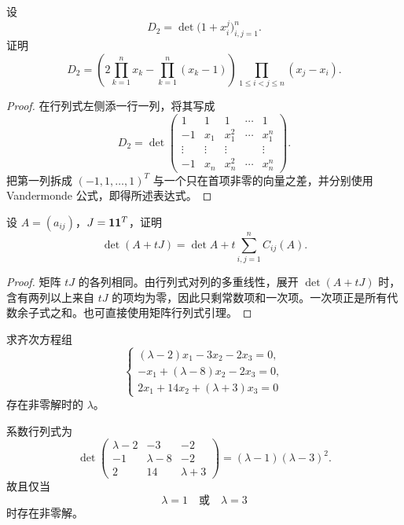 \begin{exercise}
设
\begin{equation}
 D_2=\det\bigl(1+x_i^j\bigr)_{i,j=1}^n.
\end{equation}
证明
\begin{equation}
 D_2=
 \left(2\prod_{k=1}^n x_k-\prod_{k=1}^n(x_k-1)\right)
 \prod_{1\leq i<j\leq n}(x_j-x_i).
\end{equation}
\end{exercise}

\begin{proof}
在行列式左侧添一行一列，将其写成
\begin{equation}
 D_2=
 \det\begin{pmatrix}
 1&1&1&\cdots&1\\
 -1&x_1&x_1^2&\cdots&x_1^n\\
 \vdots&\vdots&\vdots&&\vdots\\
 -1&x_n&x_n^2&\cdots&x_n^n
 \end{pmatrix}.
\end{equation}
把第一列拆成 $(-1,1,\ldots,1)^T$ 与一个只在首项非零的向量之差，并分别使用 Vandermonde 公式，即得所述表达式。
\end{proof}

\begin{exercise}[全体元素同时加参数]
设 $A=(a_{ij})$，$J=\bm 1\bm 1^T$，证明
\begin{equation}
 \det(A+tJ)=\det A+t\sum_{i,j=1}^n C_{ij}(A).
\end{equation}
\end{exercise}

\begin{proof}
矩阵 $tJ$ 的各列相同。由行列式对列的多重线性，展开 $\det(A+tJ)$ 时，含有两列以上来自 $tJ$ 的项均为零，因此只剩常数项和一次项。一次项正是所有代数余子式之和。也可直接使用矩阵行列式引理。
\end{proof}

\begin{exercise}[参数特征方程]
求齐次方程组
\begin{equation}
\begin{cases}
 (\lambda-2)x_1-3x_2-2x_3=0,\\
 -x_1+(\lambda-8)x_2-2x_3=0,\\
 2x_1+14x_2+(\lambda+3)x_3=0
\end{cases}
\end{equation}
存在非零解时的 $\lambda$。
\end{exercise}

\begin{solution}
系数行列式为
\begin{equation}
 \det\begin{pmatrix}
 \lambda-2&-3&-2\\
 -1&\lambda-8&-2\\
 2&14&\lambda+3
 \end{pmatrix}
 = (\lambda-1)(\lambda-3)^2.
\end{equation}
故且仅当
\begin{equation}
 \lambda=1\quad\text{或}\quad\lambda=3
\end{equation}
时存在非零解。
\end{solution}

